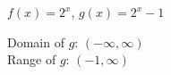 {$f(x) = 2^{x}$, $g(x) = 2^{x} - 1$ \label{graphexpfirst} }
{ Domain of $g$:  $(-\infty, \infty)$\\
 Range of $g$:  $(-1, \infty)$\\
 
\begin{center}
\end{center}}
